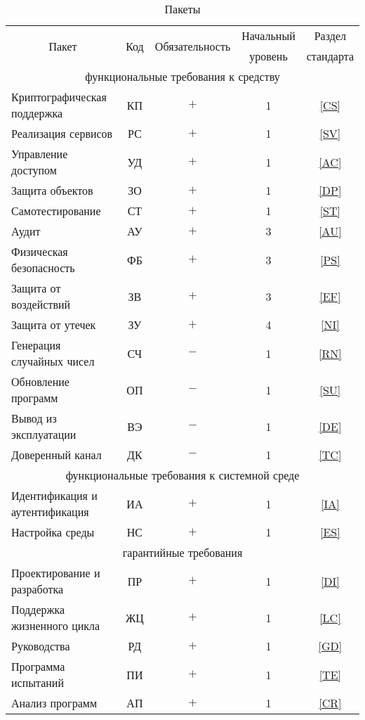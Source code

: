 \begin{table}[hbt]
\caption{Пакеты}\label{Table.COMMON.Packages}
\begin{tabular}{|l|c|c|c|c|}
\hline
\multicolumn{1}{|c|}{\multirow{2}{*}{Пакет}} & 
\multirow{2}{*}{Код} & 
\multirow{2}{*}{Обязательность} & 
Начальный & Раздел\\
&&& уровень & стандарта\\
\hline
\hline
\multicolumn{5}{|c|}{функциональные требования к средству}\\
\hline
Криптографическая поддержка & КП & $+$ & 1 & \ref{CS}\\
Реализация сервисов         & РС & $+$ & 1 & \ref{SV}\\
Управление доступом         & УД & $+$ & 1 & \ref{AC}\\
Защита объектов             & ЗО & $+$ & 1 & \ref{DP}\\
Самотестирование            & СТ & $+$ & 1 & \ref{ST}\\
Аудит                       & АУ & $+$ & 3 & \ref{AU}\\
Физическая безопасность     & ФБ & $+$ & 3 & \ref{PS}\\
Защита от воздействий       & ЗВ & $+$ & 3 & \ref{EF}\\
Защита от утечек            & ЗУ & $+$ & 4 & \ref{NI}\\
Генерация случайных чисел   & СЧ & $-$ & 1 & \ref{RN}\\
Обновление программ         & ОП & $-$ & 1 & \ref{SU}\\
Вывод из эксплуатации       & ВЭ & $-$ & 1 & \ref{DE}\\
Доверенный канал            & ДК & $-$ & 1 & \ref{TC}\\
\hline
\multicolumn{5}{|c|}{функциональные требования к системной среде}\\
\hline
Идентификация и аутентификация & ИА & $+$ & 1 & \ref{IA}\\
Настройка среды                & НС & $+$ & 1 & \ref{ES}\\
\hline
\multicolumn{5}{|c|}{гарантийные требования}\\
\hline
Проектирование и разработка & ПР & $+$ & 1 &\ref{DI}\\
Поддержка жизненного цикла  & ЖЦ & $+$ & 1 &\ref{LC}\\
Руководства                 & РД & $+$ & 1 &\ref{GD}\\
Программа испытаний         & ПИ & $+$ & 1 &\ref{TE}\\
Анализ программ             & АП & $+$ & 1 &\ref{CR}\\
\hline
\end{tabular}
\end{table}

